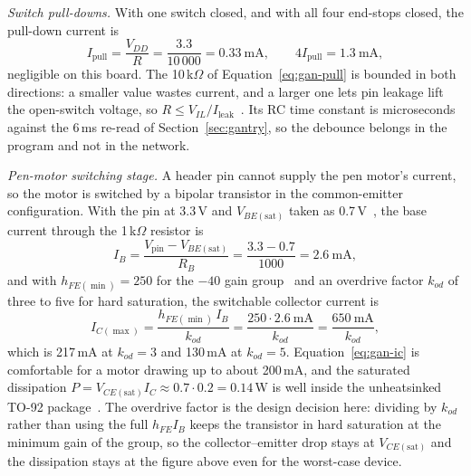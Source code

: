 \emph{Switch pull-downs.}
With one switch closed, and with all four end-stops closed, the pull-down current is
\begin{equation}
I_{\mathrm{pull}}=\frac{V_{DD}}{R}=\frac{3.3}{10\,000}=0.33\ \mathrm{mA},\qquad 4I_{\mathrm{pull}}=1.3\ \mathrm{mA},
\label{eq:gan-pull}
\end{equation}
negligible on this board.
The 10\,k$\Omega$ of Equation~\ref{eq:gan-pull} is bounded in both directions: a smaller value wastes current, and a larger one lets pin leakage lift the open-switch voltage, so $R\le V_{IL}/I_{\mathrm{leak}}$~\cite{odroidn2ds}.
Its RC time constant is microseconds against the 6\,ms re-read of Section~\ref{sec:gantry}, so the debounce belongs in the program and not in the network.

\emph{Pen-motor switching stage.}
A header pin cannot supply the pen motor's current, so the motor is switched by a bipolar transistor in the common-emitter configuration.
With the pin at 3.3\,V and $V_{BE(\mathrm{sat})}$ taken as 0.7\,V~\cite{bc337ds}, the base current through the 1\,k$\Omega$ resistor is
\begin{equation}
I_B=\frac{V_{\mathrm{pin}}-V_{BE(\mathrm{sat})}}{R_B}=\frac{3.3-0.7}{1000}=2.6\ \mathrm{mA},
\label{eq:gan-base}
\end{equation}
and with $h_{FE(\min)}=250$ for the $-40$ gain group~\cite{bc337ds} and an overdrive factor $k_{od}$ of three to five for hard saturation, the switchable collector current is
\begin{equation}
I_{C(\max)}=\frac{h_{FE(\min)}\,I_B}{k_{od}}=\frac{250\cdot2.6\ \mathrm{mA}}{k_{od}}=\frac{650\ \mathrm{mA}}{k_{od}},
\label{eq:gan-ic}
\end{equation}
which is 217\,mA at $k_{od}=3$ and 130\,mA at $k_{od}=5$.
Equation~\ref{eq:gan-ic} is comfortable for a motor drawing up to about 200\,mA, and the saturated dissipation $P=V_{CE(\mathrm{sat})}I_C\approx0.7\cdot0.2=0.14$\,W is well inside the unheatsinked TO-92 package~\cite{bc337ds}.
The overdrive factor is the design decision here: dividing by $k_{od}$ rather than using the full $h_{FE}I_B$ keeps the transistor in hard saturation at the minimum gain of the group, so the collector--emitter drop stays at $V_{CE(\mathrm{sat})}$ and the dissipation stays at the figure above even for the worst-case device.


